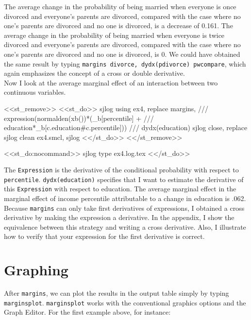 \documentclass[11pt]{article}
\begin{document}
The average change in the probability of being married when everyone is once divorced and everyone's parents are divorced, compared with the case where no one's parents are divorced and no one is divorced, is a decrease of 0.161. The average change in the probability of being married when everyone is twice divorced and everyone's parents are divorced, compared with the case where no one's parents are divorced and no one is divorced, is 0. We could have obtained the same result by typing \texttt{margins divorce, dydx(pdivorce) pwcompare}, which again emphasizes the concept of a cross or double derivative.\\

Now I look at the average marginal effect of an interaction between two continuous variables. 

<<st_remove>>
<<st_do>>
sjlog using ex4, replace 
margins,                                            ///
    expression(normalden(xb())*(_b[percentile] +    ///
    education*_b[c.education#c.percentile]))        ///
    dydx(education)
sjlog close, replace 
sjlog clean ex4.smcl, sjlog 
<</st_do>>
<</st_remove>>

\begin{stlog}[auto]
<<st_do:nocommand>>
sjlog type ex4.log.tex
<</st_do>>
\end{stlog}

The \texttt{Expression} is the derivative of the conditional probability with respect to \texttt{percentile}. \texttt{dydx(education)} specifies that I want to estimate the derivative of this \texttt{Expression} with respect to education. The average marginal effect in the marginal effect of income percentile attributable to a change in education is .062. \\

Because \texttt{margins} can only take first derivatives of expressions, I obtained a cross derivative by making the expression a derivative. In the appendix, I show the equivalence between this strategy and writing a cross derivative. Also, I illustrate how to verify that your expression for the first derivative is correct.

\section*{Graphing}

After \texttt{margins}, we can plot the results in the output table simply by typing \texttt{marginsplot}. \texttt{marginsplot} works with the conventional graphics options and the Graph Editor. For the first example above, for instance:
\end{document}
